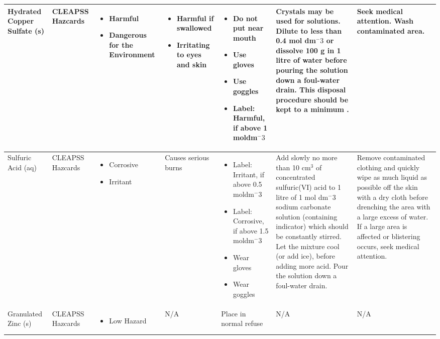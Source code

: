 \begin{landscape}
\begin{center}
\begin{longtable}{|p{1.5cm}|p{1.5cm}|p{3cm}|p{3cm}|p{3cm}|p{3cm}|p{2cm}|}
Hydrated Copper Sulfate (s) &
CLEAPSS Hazcards &
\begin{itemize}
\item Harmful
\item Dangerous for the Environment \end{itemize} &
\begin{itemize}
\item Harmful if swallowed
\item Irritating to eyes and skin \end{itemize} &
\begin{itemize}
\item Do not put near mouth
\item Use gloves
\item Use goggles
\item Label: Harmful, if above 1 moldm$^-3$ \end{itemize} &
Crystals may be used for solutions. Dilute to less than 0.4 mol dm$^-3$ or dissolve 100 g in 1 litre of water before pouring the solution down a foul-water drain. This disposal procedure should be kept to a minimum . &
Seek medical attention. Wash contaminated area. \\ \hline



Sulfuric Acid (aq) &
CLEAPSS Hazcards &
\begin{itemize}
\item Corrosive
\item Irritant \end{itemize} &
Causes serious burns & 
\begin{itemize}
\item Label: Irritant, if above 0.5 moldm$^-3$
\item Label: Corrosive, if above 1.5 moldm$^-3$
\item Wear gloves
\item Wear goggles \end{itemize} &
Add slowly no more than 10 cm$^3$ of concentrated sulfuric(VI) acid to 1 litre of 1 mol dm$^-3$ sodium carbonate solution (containing indicator) which should be constantly stirred. Let the mixture cool (or add ice), before adding more acid. Pour the solution down a foul-water drain. & 
Remove contaminated clothing and quickly wipe as much liquid as possible off the skin with a dry cloth before drenching the area with a large excess of water. If a large area is affected or blistering occurs, seek medical attention. \\ \hline

Granulated Zinc (s) &
CLEAPSS Hazcards &
\begin{itemize}
\item Low Hazard \end{itemize} &
N/A &
Place in normal refuse &
N/A &
N/A \\ \hline

\end{longtable}
\label{tab:Risk Assessment Table}

\end{center}


\end{landscape}



